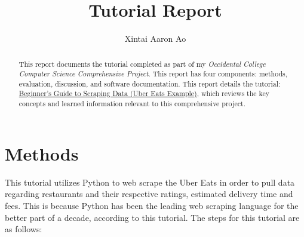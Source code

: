\documentclass[10pt,twocolumn]{article}
\title{Tutorial Report}
\author{Xintai Aaron Ao}
\affiliation{Occidental College}
\begin{document}
\maketitle

\begin{abstract}

This report documents the tutorial completed as part of my \textit{Occidental College Computer Science Comprehensive Project}. This report has four components: methods, evaluation, discussion, and software documentation. This report details the tutorial: \href{https://benminor.medium.com/beginners-guide-to-scraping-data-uber-eats-example-dca0b872be4e}{Beginner’s Guide to Scraping Data (Uber Eats Example)}, which reviews the key concepts and learned information relevant to this comprehensive project.

\end{abstract}

\section{Methods}
This tutorial utilizes Python to web scrape the Uber Eats in order to pull data regarding restaurants and their respective ratings, estimated delivery time and fees. This is because Python has been the leading web scraping language for the better part of a decade, according to this tutorial. The steps for this tutorial are as follows:
\end{document}
